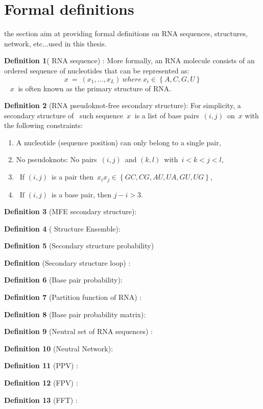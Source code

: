 \section{Formal definitions}

the section aim at providing formal definitions on RNA sequences, structures, network, etc...used in this thesis. 

\textbf{Definition 1}( RNA sequence) :  More formally, an RNA molecule consists of an ordered sequence of nucleotides that can be represented as:~ \[x\ =\ \left(x_1,...,x_L\right)\ where\ x_i\in\left\{A,C,G,U\right\}\]~
\(x_{ }\)~is often known as the primary structure of RNA.

\textbf{Definition 2} (RNA pseudoknot-free secondary structure): For simplicity, a secondary structure of ~such sequence~\(x_{ }\)~is a list of base pairs~\(\left(i,j\right)\)~on~\(x\) with the following constraints:~

\begin{enumerate}
	\item
	A nucleotide (sequence position) can only belong to a single pair,
	\item
	No pseudoknots: No pairs~\(\left(i,j\right)\)~and
	\(\left(k,l\right)\)~with~\(i<k<j<l\),
	\item
	~If \(\left(i,j\right)\)~is a pair then~\(x_ix_j \in \left\{GC,CG,AU,UA,GU,UG\right\}\),
	\item
	~If \((i,j)\)~is a base pair, then \(j-i>3\).
\end{enumerate}

\textbf{Definition 3} (MFE secondary structure):

\textbf{Definition 4} ( Structure Ensemble):

\textbf{Definition 5} (Secondary structure probability)

\textbf{Definition } (Secondary structure loop) : 

\textbf{Definition 6} (Base pair probability): 

\textbf{Definition 7} (Partition function of RNA) : 

\textbf{Definition 8} (Base pair probability matrix): 

\textbf{Definition 9} (Neutral set of RNA sequences) : 

\textbf{Definition 10} (Neutral Network): 

\textbf{Definition 11}  (PPV) : 

\textbf{Definition 12} (FPV) : 

\textbf{Definition 13 } (FFT) : 

